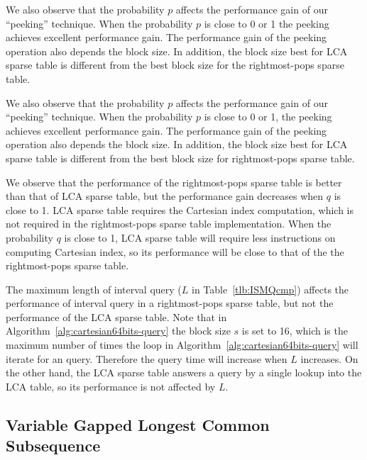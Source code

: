 

We also observe that the probability $p$ affects the performance gain
of our ``peeking'' technique.  When the probability $p$ is close to 0
or 1 the peeking achieves excellent performance gain.  The performance
gain of the peeking operation also depends the block size.  In
addition, the block size best for LCA sparse table is different from
the best block size for the rightmost-pops sparse table.

We also observe that the probability $p$ affects the performance gain
of our ``peeking'' technique.  When the probability $p$ is close to 0
or 1, the peeking achieves excellent performance gain.  The
performance gain of the peeking operation also depends the block size.
In addition, the block size best for LCA sparse table is different
from the best block size for rightmost-pops sparse table.

We observe that the performance of the rightmost-pops sparse table is
better than that of LCA sparse table, but the performance gain
decreases when $q$ is close to 1.  LCA sparse table requires the
Cartesian index computation, which is not required in the
rightmost-pops sparse table implementation.  When the probability $q$
is close to 1, LCA sparse table will require less instructions on
computing Cartesian index, so its performance will be close to that of
the the rightmost-pops sparse table.

The maximum length of interval query ($L$ in Table~\ref{tlb:ISMQcmp})
affects the performance of interval query in a rightmost-pops sparse
table, but not the performance of the LCA sparse table.  Note that in
Algorithm~\ref{alg:cartesian64bits-query} the block size $s$ is set to
16, which is the maximum number of times the loop in
Algorithm~\ref{alg:cartesian64bits-query} will iterate for an query.
Therefore the query time will increase when $L$ increases.  On the
other hand, the LCA sparse table answers a query by a single lookup
into the LCA table, so its performance is not affected by $L$.

\subsection{Variable Gapped Longest Common Subsequence}

